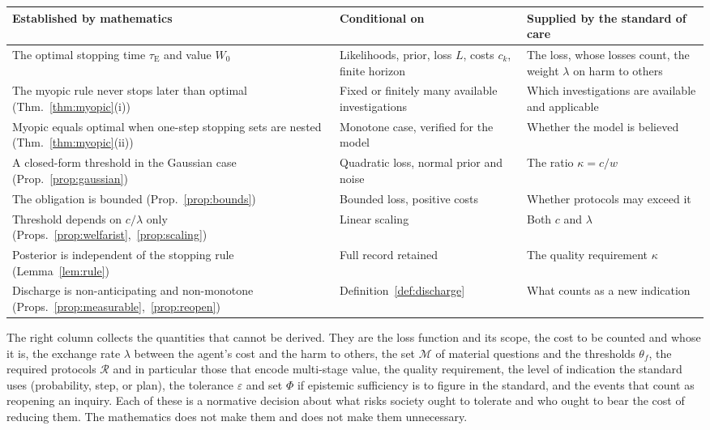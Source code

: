 \documentclass[11pt]{article}
\newcommand{\tE}{\tau_{\mathrm E}}
\theoremstyle{plain}
\theoremstyle{definition}
\begin{document}
\begin{center}
\small
\begin{tabular}{@{}p{}p{}p{}@{}}
\hline
Established by mathematics & Conditional on & Supplied by the standard of care\\
\hline
The optimal stopping time $\tE$ and value $W_0$ & Likelihoods, prior, loss $L$, costs $c_k$, finite horizon & The loss, whose losses count, the weight $\lambda$ on harm to others\\
The myopic rule never stops later than optimal (Thm.~\ref{thm:myopic}(i)) & Fixed or finitely many available investigations & Which investigations are available and applicable\\
Myopic equals optimal when one-step stopping sets are nested (Thm.~\ref{thm:myopic}(ii)) & Monotone case, verified for the model & Whether the model is believed\\
A closed-form threshold in the Gaussian case (Prop.~\ref{prop:gaussian}) & Quadratic loss, normal prior and noise & The ratio $\kappa=c/w$\\
The obligation is bounded (Prop.~\ref{prop:bounds}) & Bounded loss, positive costs & Whether protocols may exceed it\\
Threshold depends on $c/\lambda$ only (Props.~\ref{prop:welfarist},~\ref{prop:scaling}) & Linear scaling & Both $c$ and $\lambda$\\
Posterior is independent of the stopping rule (Lemma~\ref{lem:rule}) & Full record retained & The quality requirement $\kappa$\\
Discharge is non-anticipating and non-monotone (Props.~\ref{prop:measurable},~\ref{prop:reopen}) & Definition~\ref{def:discharge} & What counts as a new indication\\
\hline
\end{tabular}
\end{center}

The right column collects the quantities that cannot be derived. They are the loss function and its scope, the cost to be counted and whose it is, the exchange rate $\lambda$ between the agent's cost and the harm to others, the set $\mathcal M$ of material questions and the thresholds $\theta_f$, the required protocols $\mathcal R$ and in particular those that encode multi-stage value, the quality requirement, the level of indication the standard uses (probability, step, or plan), the tolerance $\varepsilon$ and set $\Phi$ if epistemic sufficiency is to figure in the standard, and the events that count as reopening an inquiry. Each of these is a normative decision about what risks society ought to tolerate and who ought to bear the cost of reducing them. The mathematics does not make them and does not make them unnecessary.
\end{document}
